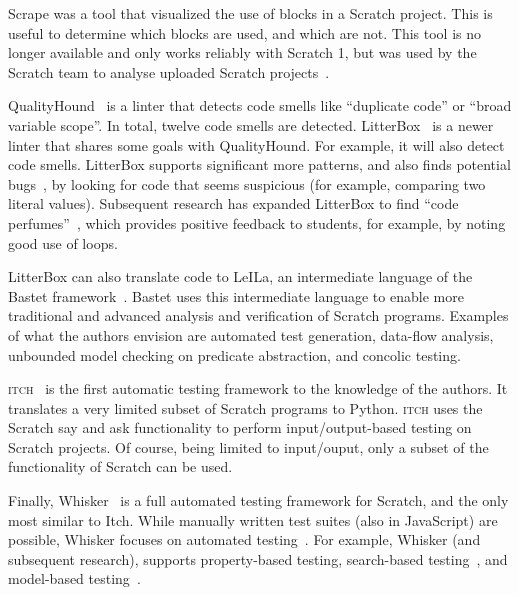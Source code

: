 \documentclass[../main]{subfiles}
\begin{document}
Scrape was a tool that visualized the use of blocks in a Scratch project.
This is useful to determine which blocks are used, and which are not.
This tool is no longer available and only works reliably with Scratch 1, but was used by the Scratch team to analyse uploaded Scratch projects~\autocite{brennan2012new}.

QualityHound~\autocite{techapalokulQualityHoundOnline2017} is a linter that detects code smells like ``duplicate code'' or ``broad variable scope''.
In total, twelve code smells are detected.
LitterBox~\autocite{fraserLitterBoxLinterScratch2021} is a newer linter that shares some goals with QualityHound.
For example, it will also detect code smells.
LitterBox supports significant more patterns, and also finds potential bugs~\autocite{fradrichCommonBugsScratch2020}, by looking for code that seems suspicious (for example, comparing two literal values).
Subsequent research has expanded LitterBox to find ``code perfumes''~\autocite{obermullerCodePerfumesReporting2021}, which provides positive feedback to students, for example, by noting good use of loops.

LitterBox can also translate code to LeILa, an intermediate language of the Bastet framework~\autocite{stahlbauerVerifiedScratchProgram2020}.
Bastet uses this intermediate language to enable more traditional and advanced analysis and verification of Scratch programs.
Examples of what the authors envision are automated test generation, data-flow analysis, unbounded model checking on predicate abstraction, and concolic testing.

\textsc{itch}~\autocite{johnsonITCHIndividualTesting2016} is the first automatic testing framework to the knowledge of the authors.
It translates a very limited subset of Scratch programs to Python.
\textsc{itch} uses the Scratch say and ask functionality to perform input/output-based testing on Scratch projects.
Of course, being limited to input/ouput, only a subset of the functionality of Scratch can be used.

Finally, Whisker~\autocite{stahlbauerTestingScratchPrograms2019} is a full automated testing framework for Scratch, and the only most similar to Itch.
While manually written test suites (also in JavaScript) are possible, Whisker focuses on automated testing~\autocite{deinerAutomatedTestGeneration2023}.
For example, Whisker (and subsequent research), supports property-based testing, search-based testing~\autocite{deinerSearchBasedTestingScratch2020}, and model-based testing~\autocite{gotzModelbasedTestingScratch2022}.
\end{document}
